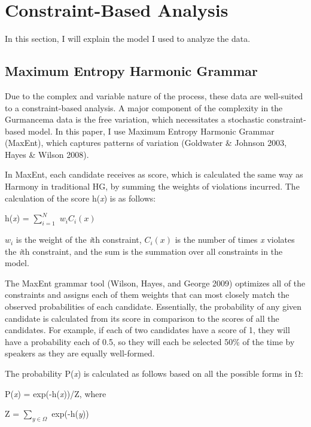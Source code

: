 \documentclass[output=paper,
modfonts
]{langscibook}
\begin{document}
\section{Constraint-Based Analysis}
In this section, I will explain the model I used to analyze the data. 

\subsection{Maximum Entropy Harmonic Grammar}

Due to the complex and variable nature of the process, these data are well-suited to a constraint-based analysis. A major component of the complexity in the Gurmancema data is the free variation, which necessitates a stochastic constraint-based model. In this paper, I use Maximum Entropy Harmonic Grammar (MaxEnt), which captures patterns of variation (Goldwater \& Johnson 2003, Hayes \& Wilson 2008). 
	 
In MaxEnt, each candidate receives as score, which is calculated the same way as Harmony in traditional HG, by summing the weights of violations incurred. The calculation of the score h(\textit{x}) is as follows: 

\ea
h(\textit{x}) = $\sum_{\textit{i}=1}^{\textit{N}}$ ${w_i}{C_i}(x)$

\z

${w_i}$ is the weight of the \textit{i}th constraint, ${C_i}(x)$ is the number of times \textit{x} violates the \textit{i}th constraint, and the sum is the summation over all constraints in the model.  

The MaxEnt grammar tool (Wilson, Hayes, and George 2009) optimizes all of the constraints and assigns each of them weights that can most closely match the observed probabilities of each candidate. Essentially, the probability of any given candidate is calculated from its score in comparison to the scores of all the candidates. For example, if each of two candidates have a score of 1, they will have a probability each of 0.5, so they will each be selected 50\% of the time by speakers as they are equally well-formed.

The probability P(\textit{x}) is calculated as follows based on all the possible forms in Ω:

\ea

P(\textit{x}) = exp(-h(\textit{x}))/Z, where \newline

Z = $\sum_{y\in \varOmega}$ exp(-h(\textit{y}))
\z
\end{document}
